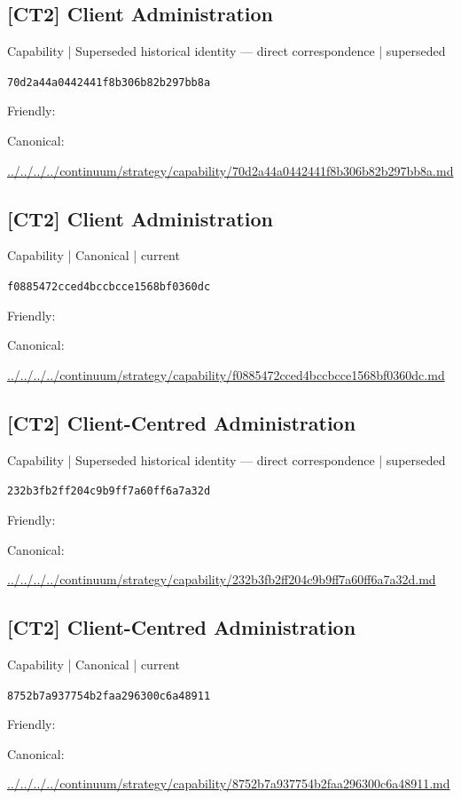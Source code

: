 \documentclass[10pt,a4paper]{article}
\begin{document}
\subsection*{[CT2] Client Administration}
{\small Capability | Superseded historical identity — direct correspondence | superseded}\par
\texttt{70d2a44a0442441f8b306b82b297bb8a}\par
Friendly: \par
Canonical: \par
{\footnotesize\url{../../../../continuum/strategy/capability/70d2a44a0442441f8b306b82b297bb8a.md}}\par
\subsection*{[CT2] Client Administration}
{\small Capability | Canonical | current}\par
\texttt{f0885472cced4bccbcce1568bf0360dc}\par
Friendly: \par
Canonical: \par
{\footnotesize\url{../../../../continuum/strategy/capability/f0885472cced4bccbcce1568bf0360dc.md}}\par
\subsection*{[CT2] Client-Centred Administration}
{\small Capability | Superseded historical identity — direct correspondence | superseded}\par
\texttt{232b3fb2ff204c9b9ff7a60ff6a7a32d}\par
Friendly: \par
Canonical: \par
{\footnotesize\url{../../../../continuum/strategy/capability/232b3fb2ff204c9b9ff7a60ff6a7a32d.md}}\par
\subsection*{[CT2] Client-Centred Administration}
{\small Capability | Canonical | current}\par
\texttt{8752b7a937754b2faa296300c6a48911}\par
Friendly: \par
Canonical: \par
{\footnotesize\url{../../../../continuum/strategy/capability/8752b7a937754b2faa296300c6a48911.md}}\par
\end{document}
